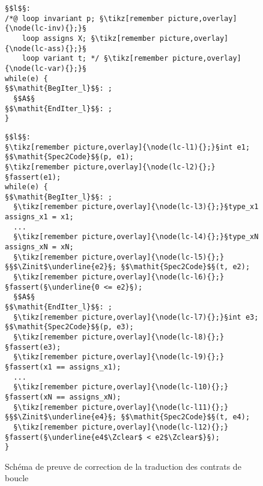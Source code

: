 \begin{figure}[bt]
  \begin{minipage}{0.65\textwidth}
    \begin{lstlisting}[escapechar=§]
§$l$§:
/*@ loop invariant p; §\tikz[remember picture,overlay]{\node(lc-inv){};}§
    loop assigns X; §\tikz[remember picture,overlay]{\node(lc-ass){};}§
    loop variant t; */ §\tikz[remember picture,overlay]{\node(lc-var){};}§
while(e) {
§$\mathit{BegIter_l}$§: ;
  §$A$§
§$\mathit{EndIter_l}$§: ;
}
    \end{lstlisting}
  \end{minipage}\hfill
  \begin{minipage}{0.49\textwidth}
    \begin{lstlisting}[escapechar=§]
§$l$§:
§\tikz[remember picture,overlay]{\node(lc-l1){};}§int e1; §$\mathit{Spec2Code}$§(p, e1);
§\tikz[remember picture,overlay]{\node(lc-l2){};}§fassert(e1);
while(e) {
§$\mathit{BegIter_l}$§: ;
  §\tikz[remember picture,overlay]{\node(lc-l3){};}§type_x1 assigns_x1 = x1;
  ...
  §\tikz[remember picture,overlay]{\node(lc-l4){};}§type_xN assigns_xN = xN;
  §\tikz[remember picture,overlay]{\node(lc-l5){};}§§$\Zinit$\underline{e2}§; §$\mathit{Spec2Code}$§(t, e2);
  §\tikz[remember picture,overlay]{\node(lc-l6){};}§fassert(§\underline{0 <= e2}§);
  §$A$§
§$\mathit{EndIter_l}$§: ;
  §\tikz[remember picture,overlay]{\node(lc-l7){};}§int e3; §$\mathit{Spec2Code}$§(p, e3);
  §\tikz[remember picture,overlay]{\node(lc-l8){};}§fassert(e3);
  §\tikz[remember picture,overlay]{\node(lc-l9){};}§fassert(x1 == assigns_x1);
  ...
  §\tikz[remember picture,overlay]{\node(lc-l10){};}§fassert(xN == assigns_xN);
  §\tikz[remember picture,overlay]{\node(lc-l11){};}§§$\Zinit$\underline{e4}§; §$\mathit{Spec2Code}$§(t, e4);
  §\tikz[remember picture,overlay]{\node(lc-l12){};}§fassert(§\underline{e4$\Zclear$ < e2$\Zclear$}§);
}
    \end{lstlisting}
  \end{minipage}
  \caption{Schéma de preuve de correction de la traduction des contrats de
    boucle}
  \label{fig:proof-loop-contract}
\end{figure}
